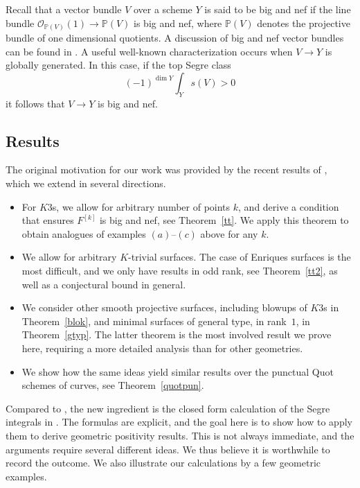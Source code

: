 \documentclass[10pt,a4paper]{amsart}
\numberwithin{equation}{section}
\begin{document}
Recall that a vector bundle $V$ over a scheme $Y$ is said to be big and nef if the line bundle $\mathcal O_{\mathbb P(V)}(1)\to \mathbb P(V)$ is big and nef, where $\mathbb P(V)$ denotes the projective bundle of one dimensional quotients. A discussion of big and nef vector bundles can be found in \cite[Chapters~6 and~7]{L-II}.
A useful well-known characterization occurs when $V\to Y$ is globally generated. In this case, if the top Segre class
\begin{equation}
\label{pos}(-1)^{\dim Y} \int_{Y} s(V)>0
\end{equation}
it follows that $V\to Y$ is big and nef.

\subsection{Results} The original motivation for our work was provided by the recent results of \cite{BBF}, which we extend in several directions.
\begin{itemize}\itemsep=0pt
\item [$(i)$] For $K3$s, we allow for arbitrary number of points $k$, and derive a condition that ensures $F^{[k]}$ is big and nef, see Theorem~\ref{tt}. We apply this theorem to obtain analogues of examples $(a)$--$(c)$ above for any $k$.
\item [$(ii)$] We allow for arbitrary $K$-trivial surfaces. The case of Enriques surfaces is the most difficult, and we only have results in odd rank, see Theorem~\ref{tt2}, as well as a conjectural bound in general.
\item [$(iii)$] We consider other smooth projective surfaces, including blowups of $K3$s in Theorem~\ref{blok}, and minimal surfaces of general type, in rank~$1$, in Theorem~\ref{gtyp}. The latter theorem is the most involved result we prove here, requiring a more detailed analysis than for other geometries.
\item [$(iv)$] We show how the same ideas yield similar results over the punctual Quot schemes of curves, see Theorem~\ref{quotpun}.
\end{itemize}

Compared to \cite{BBF}, the new ingredient is the closed form calculation of the Segre integrals in \cite{MOP2, MOP1, MOP, OP2021}. The formulas are explicit, and the goal here is to show how to apply them to derive geometric positivity results. This is not always immediate, and the arguments require several different ideas. We thus believe it is worthwhile to record the outcome. We also illustrate our calculations by a few geometric examples.
\end{document}

